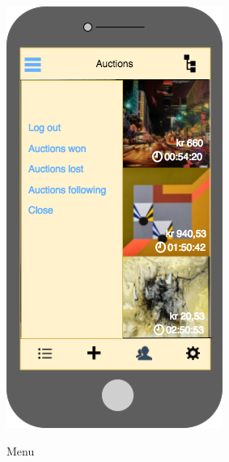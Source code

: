 \begin{figure}[H]
\centering
  \begin{minipage}[b]{0.31\linewidth}
    \caption{Menu}
    \includegraphics[width=\linewidth]{Appendix/HorizontalPrototype/3.png}
    \label{MainMenu}
  \end{minipage}

\end{figure}
